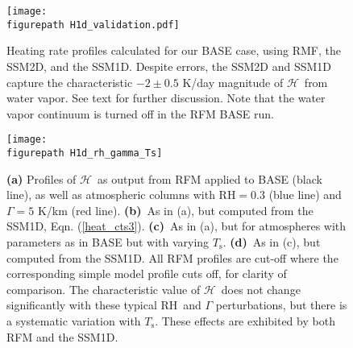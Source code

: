\documentclass{ametsoc}
\newcommand{\eqnref}[1]{(\ref{#1})}
\newcommand{\Ts}{\ensuremath{T_\mathrm{s}}}
\newcommand{\RH}{\ensuremath{\mathrm{RH}}}
\newcommand{\ch}{\ensuremath{\mathcal{H}}}
\newcommand{\figurepath}{./}
\begin{document}
\begin{figure}[h!]
	\begin{center}
			\texttt{[image: \\figurepath H1d\_validation.pdf]}
		\caption{ Heating rate profiles calculated for our BASE case, using RMF, the SSM2D, and the SSM1D.  Despite errors, the SSM2D and SSM1D capture the characteristic $-2 \pm 0.5$ K/day magnitude of \ch\ from water vapor. See text for further discussion. Note that the water vapor continuum is turned off in the RFM BASE run.
	  \label{H1d_validation}
		}
	\end{center}
\end{figure}

\begin{figure}[h]
	\begin{center}
			\texttt{[image: \\figurepath H1d\_rh\_gamma\_Ts]}
		\caption{\textbf{(a)} Profiles of \ch\ as output from RFM applied to BASE (black line), as well as atmospheric columns with $\RH=0.3$ (blue line) and $\Gamma=5$ K/km (red line). 
					\textbf{(b)}\ As in (a), but computed from the SSM1D, Eqn. \eqnref{heat_cts3}. 
					\textbf{(c)}\ As in (a), but for atmospheres with parameters as in BASE but with varying \Ts.
					\textbf{(d)}\ As in (c), but computed from the SSM1D. 
					All RFM profiles are cut-off where the corresponding simple model profile cuts off, for clarity of comparison. The characteristic value of \ch\   does not change significantly with these typical \RH\ and $\Gamma$ perturbations, but there is a systematic variation with \Ts. These effects are exhibited by both RFM and the SSM1D.
		\label{H1d_rh_gamma_Ts}
		}
	\end{center}
\end{figure}
\end{document}
